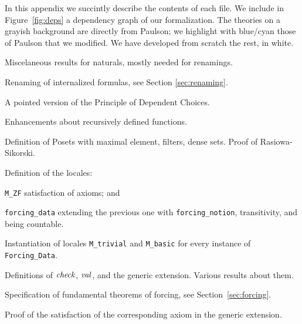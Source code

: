 In this appendix we succintly describe the contents of each file. We
include in 
Figure~\ref{fig:deps}  a dependency graph of our formalization. The
theories on a grayish background are directly from Paulson; we
highlight with blue/cyan those of Paulson that we modified. We
have developed from scratch the rest, in white.

\begin{description}[itemsep=1.5pt]
\item[\texttt{Nat\_Miscelanea}]Miscelaneous results for naturals, mostly
  needed for renamings.
\item[\texttt{Renaming}] Renaming of internalized formulas, see
  Section \ref{sec:renaming}.
\item[\texttt{Pointed\_DC}] A pointed version of the Principle of
  Dependent Choices.
\item[\texttt{Recursion\_Thms}] Enhancements about recursively defined
  functions.
\item[\texttt{Forcing\_Notions}] Definition of Posets with maximal
  element, filters, dense sets. Proof of Rasiowa-Sikorski.
\item[\texttt{Forcing\_Data}] Definition of the locales:
  \begin{inlinelist}
  \item \texttt{M\_ZF} satisfaction of axioms; and 
  \item \texttt{forcing\_data} extending the previous one with
    \texttt{forcing\_notion}, transitivity, and being countable.
  \end{inlinelist}
\item[\texttt{Interface}] Instantiation of locales \texttt{M\_trivial}
  and \texttt{M\_basic} for every instance of \texttt{Forcing\_Data}.
\item[\texttt{Names}] Definitions of $\operatorname{\mathit{check}}$, $\operatorname{\mathit{val}}$, and the generic
  extension. Various results about them.
\item[\texttt{Forcing\_Theorems}] Specification of fundamental
  theorems of forcing, see Section~\ref{sec:forcing}.
\item[\texttt{*\_Axiom}] Proof of the satisfaction of the
  corresponding axiom in the generic extension.
\end{description}
%
